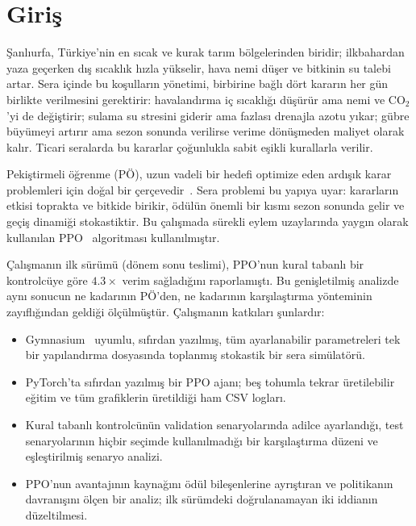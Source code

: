 \documentclass[conference,a4paper]{IEEEtran}
\begin{document}
\section{Giriş}

Şanlıurfa, Türkiye'nin en sıcak ve kurak tarım bölgelerinden biridir; ilkbahardan yaza geçerken dış sıcaklık hızla yükselir, hava nemi düşer ve bitkinin su talebi artar. Sera içinde bu koşulların yönetimi, birbirine bağlı dört kararın her gün birlikte verilmesini gerektirir: havalandırma iç sıcaklığı düşürür ama nemi ve CO$_2$'yi de değiştirir; sulama su stresini giderir ama fazlası drenajla azotu yıkar; gübre büyümeyi artırır ama sezon sonunda verilirse verime dönüşmeden maliyet olarak kalır. Ticari seralarda bu kararlar çoğunlukla sabit eşikli kurallarla verilir.

Pekiştirmeli öğrenme (PÖ), uzun vadeli bir hedefi optimize eden ardışık karar problemleri için doğal bir çerçevedir~\cite{sutton2018}. Sera problemi bu yapıya uyar: kararların etkisi toprakta ve bitkide birikir, ödülün önemli bir kısmı sezon sonunda gelir ve geçiş dinamiği stokastiktir. Bu çalışmada sürekli eylem uzaylarında yaygın olarak kullanılan PPO~\cite{schulman2017} algoritması kullanılmıştır.

Çalışmanın ilk sürümü (dönem sonu teslimi), PPO'nun kural tabanlı bir kontrolcüye göre $4.3\times$ verim sağladığını raporlamıştı. Bu genişletilmiş analizde aynı sonucun ne kadarının PÖ'den, ne kadarının karşılaştırma yönteminin zayıflığından geldiği ölçülmüştür. Çalışmanın katkıları şunlardır:
\begin{itemize}
\item Gymnasium~\cite{towers2024} uyumlu, sıfırdan yazılmış, tüm ayarlanabilir parametreleri tek bir yapılandırma dosyasında toplanmış stokastik bir sera simülatörü.
\item PyTorch'ta sıfırdan yazılmış bir PPO ajanı; beş tohumla tekrar üretilebilir eğitim ve tüm grafiklerin üretildiği ham CSV logları.
\item Kural tabanlı kontrolcünün validation senaryolarında adilce ayarlandığı, test senaryolarının hiçbir seçimde kullanılmadığı bir karşılaştırma düzeni ve eşleştirilmiş senaryo analizi.
\item PPO'nun avantajının kaynağını ödül bileşenlerine ayrıştıran ve politikanın davranışını ölçen bir analiz; ilk sürümdeki doğrulanamayan iki iddianın düzeltilmesi.
\end{itemize}
\end{document}
